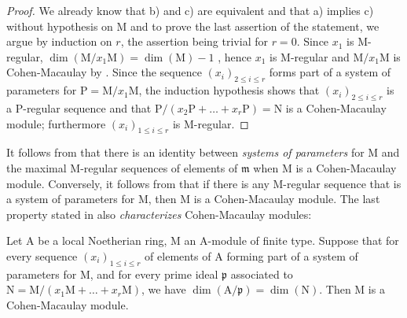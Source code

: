 \begin{proof}
We already know that b) and c) are equivalent  and that a) implies c)  without hypothesis on $\mathrm{M}$ and to prove the last assertion of the statement, we argue by induction on $r$, the assertion being trivial for $r=0$.
Since $x_1$ is $\mathrm{M}$-regular, $\dim(\mathrm{M}/x_1\mathrm{M})=\dim(\mathrm{M})-1$ , hence $x_1$ is $\mathrm{M}$-regular and $\mathrm{M}/x_1\mathrm{M}$ is Cohen-Macaulay by .
Since the sequence $(x_i)_{2\leq i\leq r}$ forms part of a system of parameters for $\mathrm{P}=\mathrm{M}/x_1\mathrm{M}$, the induction hypothesis shows that $(x_i)_{2\leq i\leq r}$ is a $\mathrm{P}$-regular sequence and that $\mathrm{P}/(x_2\mathrm{P}+\ldots+x_r\mathrm{P})=\mathrm{N}$ is a Cohen-Macaulay module; furthermore $(x_i)_{1\leq i\leq r}$ is $\mathrm{M}$-regular.
\end{proof}

\begin{remark}[16.5.7]
\label{0.16.5.7}
It follows from  that there is an identity between \emph{systems of parameters} for $\mathrm{M}$ and the maximal $\mathrm{M}$-regular sequences of elements of $\mathfrak{m}$ when $\mathrm{M}$ is a Cohen-Macaulay module.
Conversely, it follows from  that if there is any $\mathrm{M}$-regular sequence that is a system of parameters for $\mathrm{M}$, then $\mathrm{M}$ is a Cohen-Macaulay module.
The last property stated in  also \emph{characterizes} Cohen-Macaulay modules:
\end{remark}

\begin{proposition}[16.5.8]
\label{0.16.5.8}
Let $\mathrm{A}$ be a local Noetherian ring, $\mathrm{M}$ an $\mathrm{A}$-module of finite type.
Suppose that for every sequence $(x_i)_{1\leq i\leq r}$ of elements of $\mathrm{A}$ forming part of a system of parameters for $\mathrm{M}$, and for every prime ideal $\mathfrak{p}$ associated to $\mathrm{N}=\mathrm{M}/(x_1\mathrm{M}+\ldots+x_r\mathrm{M})$, we have $\dim(\mathrm{A}/\mathfrak{p})=\dim(\mathrm{N})$.
Then $\mathrm{M}$ is a Cohen-Macaulay module.
\end{proposition}

